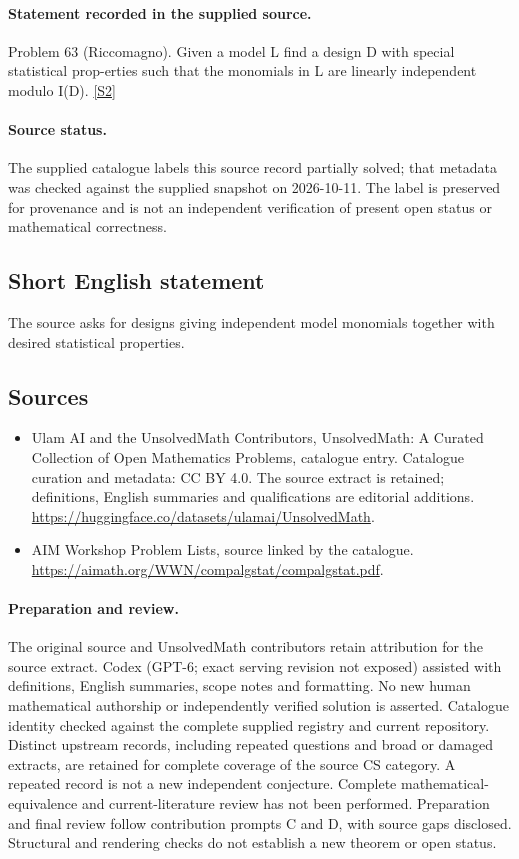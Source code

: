 \documentclass[11pt]{article}
\begin{document}
\paragraph{Statement recorded in the supplied source.}
Problem 63 (Riccomagno). Given a model L find a design D with special statistical prop-erties such that the monomials in L are linearly independent modulo I(D). \href{https://aimath.org/WWN/compalgstat/compalgstat.pdf}{[S2]}
\paragraph{Source status.}
The supplied catalogue labels this source record partially solved; that metadata was checked against the supplied snapshot on 2026-10-11. The label is preserved for provenance and is not an independent verification of present open status or mathematical correctness.
\subsection{Short English statement}
The source asks for designs giving independent model monomials together with desired statistical properties.
\subsection{Sources}
\begin{itemize}
\item[S1] Ulam AI and the UnsolvedMath Contributors, UnsolvedMath: A Curated Collection of Open Mathematics Problems, catalogue entry. Catalogue curation and metadata: CC BY 4.0. The source extract is retained; definitions, English summaries and qualifications are editorial additions.
\url{https://huggingface.co/datasets/ulamai/UnsolvedMath}.
\item[S2] AIM Workshop Problem Lists, source linked by the catalogue.
\url{https://aimath.org/WWN/compalgstat/compalgstat.pdf}.
\end{itemize}
\paragraph{Preparation and review.}
The original source and UnsolvedMath contributors retain attribution for the source extract. Codex (GPT-6; exact serving revision not exposed) assisted with definitions, English summaries, scope notes and formatting. No new human mathematical authorship or independently verified solution is asserted. Catalogue identity checked against the complete supplied registry and current repository. Distinct upstream records, including repeated questions and broad or damaged extracts, are retained for complete coverage of the source CS category. A repeated record is not a new independent conjecture. Complete mathematical-equivalence and current-literature review has not been performed. Preparation and final review follow contribution prompts C and D, with source gaps disclosed. Structural and rendering checks do not establish a new theorem or open status.
\label{end:statement}
\end{document}
